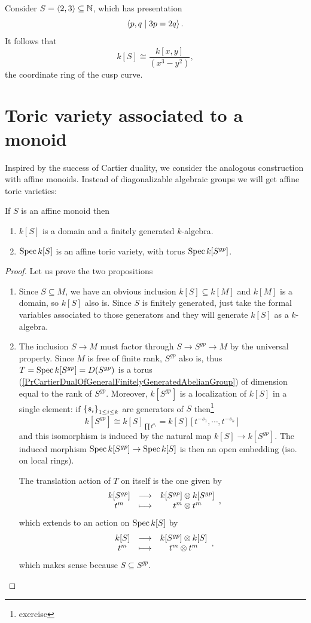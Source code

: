 \begin{example}
Consider $S=\left\langle {2,3}\right\rangle\subseteq \mathbb{N}$, which has presentation
\[\left\langle {p,q\mid 3p=2q}\right\rangle.\]
It follows that
\[k[S]\cong \frac{k[x,y]}{(x^3-y^2)},\]
the coordinate ring of the cusp curve.
\end{example}


\section{Toric variety associated to a monoid}
Inspired by the success of Cartier duality, we consider the analogous construction with affine monoids. Instead of diagonalizable algebraic groups we will get affine toric varieties:

\begin{proposition}[]\label{PrToricVarietyAssociatedToAffineMonoid}
If $S$ is an affine monoid then
\begin{enumerate}
\item $k[S]$ is a domain and a finitely generated $k$-algebra.
\item $\operatorname{Spec} k[S]$ is an affine toric variety, with torus $\operatorname{Spec} k[S^{gp}]$.
\end{enumerate}
\end{proposition}
\begin{proof}
Let us prove the two propositions
\setlength{\leftmargini}{0cm}
\begin{enumerate}
\item Since $S\subseteq M$, we have an obvious inclusion $k[S]\subseteq k[M]$ and $k[M]$ is a domain, so $k[S]$ also is. Since $S$ is finitely generated, just take the formal variables associated to those generators and they will generate $k[S]$ as a $k$-algebra.
\item The inclusion $S\to M$ must factor through $S\to S^{gp}\to M$ by the universal property. Since $M$ is free of finite rank, $S^{gp}$ also is, thus $T=\operatorname{Spec} k[S^{gp}]=D(S^{gp})$ is a torus (\ref{PrCartierDualOfGeneralFinitelyGeneratedAbelianGroup}) of dimension equal to the rank of $S^{gp}$. Moreover, $k[S^{gp}]$ is a localization of $k[S]$ in a single element: if $\left\{{s_i}\right\}_{1\leq i\leq k}$ are generators of $S$ then\footnote{exercise}
\[k[S^{gp}]\cong k[S]_{\prod t^{s_i}}=k[S][t^{-s_1},\cdots,t^{-s_k}]\]
and this isomorphism is induced by the natural map $k[S]\to k[S^{gp}]$. The induced morphism $\operatorname{Spec} k[S^{gp}]\to \operatorname{Spec} k[S]$ is then an open embedding (iso. on local rings).

The translation action of $T$ on itself is the one given by
\[\begin{array}{ccc} {k[S^{gp}]} & \longrightarrow & {k[S^{gp}]\otimes k[S^{gp}]}\\ {t^m} & \longmapsto & {t^m\otimes t^m} \end{array},\]
which extends to an action on $\operatorname{Spec} k[S]$ by
\[\begin{array}{ccc} {k[S]} & \longrightarrow & {k[S^{gp}]\otimes k[S]}\\ {t^m} & \longmapsto & {t^m\otimes t^m} \end{array},\]
which makes sense because $S\subseteq S^{gp}$.
\end{enumerate}
\setlength{\leftmargini}{0.5cm}
\end{proof}

